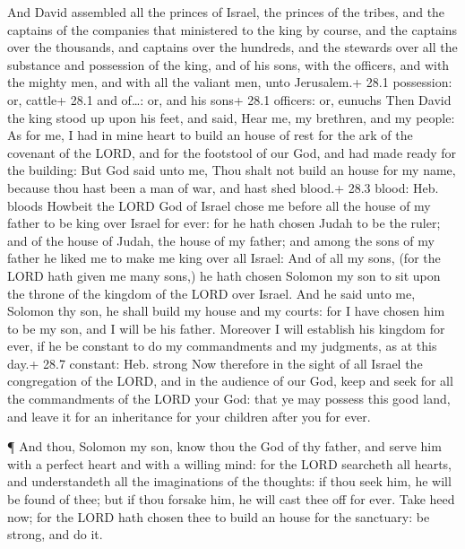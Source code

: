  And David assembled all the princes of Israel, the princes
of the tribes, and the captains of the companies that ministered to the
king by course, and the captains over the thousands, and captains over
the hundreds, and the stewards over all the substance and possession of
the king, and of his sons, with the officers, and with the mighty men,
and with all the valiant men, unto Jerusalem.+ 28.1 possession: or,
cattle+ 28.1 and of\ldots: or, and his sons+ 28.1 officers: or, eunuchs
 Then David the king stood up upon his feet, and said, Hear
me, my brethren, and my people: As for me, I had in mine heart to build
an house of rest for the ark of the covenant of the LORD, and for the
footstool of our God, and had made ready for the building: 
But God said unto me, Thou shalt not build an house for my name, because
thou hast been a man of war, and hast shed blood.+ 28.3 blood: Heb.
bloods  Howbeit the LORD God of Israel chose me before all
the house of my father to be king over Israel for ever: for he hath
chosen Judah to be the ruler; and of the house of Judah, the house of my
father; and among the sons of my father he liked me to make me king over
all Israel:  And of all my sons, (for the LORD hath given me
many sons,) he hath chosen Solomon my son to sit upon the throne of the
kingdom of the LORD over Israel.  And he said unto me,
Solomon thy son, he shall build my house and my courts: for I have
chosen him to be my son, and I will be his father.  Moreover
I will establish his kingdom for ever, if he be constant to do my
commandments and my judgments, as at this day.+ 28.7 constant: Heb.
strong  Now therefore in the sight of all Israel the
congregation of the LORD, and in the audience of our God, keep and seek
for all the commandments of the LORD your God: that ye may possess this
good land, and leave it for an inheritance for your children after you
for ever.

 ¶ And thou, Solomon my son, know thou the God of thy
father, and serve him with a perfect heart and with a willing mind: for
the LORD searcheth all hearts, and understandeth all the imaginations of
the thoughts: if thou seek him, he will be found of thee; but if thou
forsake him, he will cast thee off for ever.  Take heed
now; for the LORD hath chosen thee to build an house for the sanctuary:
be strong, and do it.

